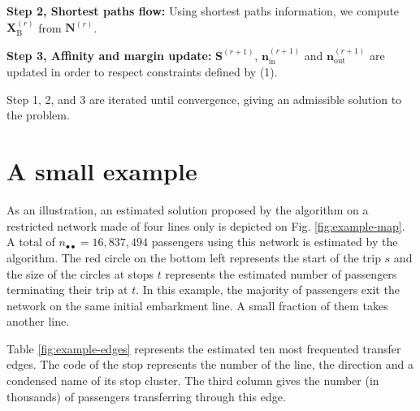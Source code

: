 \documentclass{bmcart}
\begin{document}
{{\begin{minipage}{\textwidth}
\textbf{Step 2, Shortest paths flow:}
Using shortest paths information, we compute $\mathbf{X}^{(r)}_\text{B}$ from $\mathbf{N}^{(r)}$.

\textbf{Step 3, Affinity and margin update:}
$\mathbf{S}^{(r+1)}$, $\mathbf{n}^{(r+1)}_\text{in}$ and $\mathbf{n}^{(r+1)}_\text{out}$ are updated in order to respect constraints defined by (1).
\end{minipage}}

Step 1, 2, and 3 are iterated until convergence, giving an admissible solution to the problem.
%
\section{A small example}
%

As an illustration, an estimated solution proposed by the algorithm on a restricted network made of four lines only is depicted on Fig. \ref{fig:example-map}. A total of $n_{\bullet \bullet} = 16,837,494$ passengers using this network is estimated by the algorithm. The red circle on the bottom left represents the start of the trip $s$ and the size of the circles at stops $t$ represents the estimated number of passengers terminating their trip at $t$. In this example, the majority of passengers exit the network on the same initial embarkment line. A small fraction of them takes another line. 

Table \ref{fig:example-edges} represents the estimated ten most frequented transfer edges. The code of the stop represents the number of the line, the direction and a condensed name of its stop cluster. The third column gives the number (in thousands) of passengers transferring through this edge.

}
\end{document}
